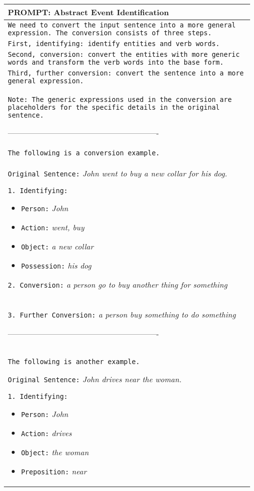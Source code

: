 \begin{table*}[]
    \centering
    \begin{tabular}{p{14cm}}
\toprule
\textbf{PROMPT: Abstract Event Identification}\\
\midrule
\texttt{We need to convert the input sentence into a more general expression. The conversion consists of three steps.} \\

\texttt{First, identifying: identify entities and verb words.} \\ 
\texttt{Second, conversion: convert the entities with more generic words and transform the verb words into the base form.} \\
\texttt{Third, further conversion: convert the sentence into a more general expression.} \\
\texttt{Note: The generic expressions used in the conversion are placeholders for the specific details in the original sentence.}

---------------------------------------------------------- \\ 
\texttt{The following is a conversion example.} \\

\texttt{Original Sentence:} \textit{John went to buy a new collar for his dog.}

\texttt{1. Identifying:}
\begin{itemize}[noitemsep]
    \item \texttt{Person:} \textit{John}
    \item \texttt{Action:} \textit{went, buy}
    \item \texttt{Object:} \textit{a new collar}
    \item \texttt{Possession:} \textit{his dog}
\end{itemize} 
        
\texttt{2. Conversion:} \textit{a person go to buy another thing for something} \\

\texttt{3. Further Conversion:} \textit{a person buy something to do something}

---------------------------------------------------------- \\
        
\texttt{The following is another example.}

\texttt{Original Sentence:} \textit{John drives near the woman.} 

\texttt{1. Identifying:}
\begin{itemize}[noitemsep]
    \item \texttt{Person:} \textit{John}
    \item \texttt{Action:} \textit{drives}
    \item \texttt{Object:} \textit{the woman}
    \item \texttt{Preposition:} \textit{near}
\end{itemize} 
        

\end{tabular}
\end{table*}
